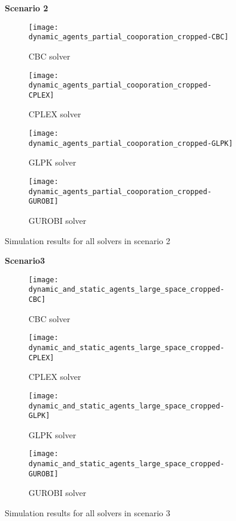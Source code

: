 \begin{figure}[H]
    \centering
    \textbf{Scenario 2}\par \medskip
    \begin{subfigure}{0.49\textwidth}
        \centering
        \texttt{[image: dynamic\_agents\_partial\_cooporation\_cropped-CBC]}
        \caption{CBC solver}
    \end{subfigure}
    \begin{subfigure}{0.49\textwidth}
        \centering
        \texttt{[image: dynamic\_agents\_partial\_cooporation\_cropped-CPLEX]}
        \caption{CPLEX solver}
    \end{subfigure}
    \begin{subfigure}{0.49\textwidth}
        \centering
        \texttt{[image: dynamic\_agents\_partial\_cooporation\_cropped-GLPK]}
        \caption{GLPK solver}
    \end{subfigure}
    \begin{subfigure}{0.49\textwidth}
        \centering
        \texttt{[image: dynamic\_agents\_partial\_cooporation\_cropped-GUROBI]}
        \caption{GUROBI solver}
    \end{subfigure}
	\label{fig:dynamic_agents_partial_cooperation_cropped}
	\caption{Simulation results for all solvers in scenario 2}
\end{figure}

\begin{figure}[H]
    \centering
    \textbf{Scenario3}\par \medskip
    \begin{subfigure}{0.49\textwidth}
        \centering
        \texttt{[image: dynamic\_and\_static\_agents\_large\_space\_cropped-CBC]}
        \caption{CBC solver}
    \end{subfigure}
    \begin{subfigure}{0.49\textwidth}
        \centering
        \texttt{[image: dynamic\_and\_static\_agents\_large\_space\_cropped-CPLEX]}
        \caption{CPLEX solver}
    \end{subfigure}
    \begin{subfigure}{0.49\textwidth}
        \centering
        \texttt{[image: dynamic\_and\_static\_agents\_large\_space\_cropped-GLPK]}
        \caption{GLPK solver}
    \end{subfigure}
    \begin{subfigure}{0.49\textwidth}
        \centering
        \texttt{[image: dynamic\_and\_static\_agents\_large\_space\_cropped-GUROBI]}
        \caption{GUROBI solver}
    \end{subfigure}
	\label{fig:dynamic_and_static_agents_large_space_cropped}
	\caption{Simulation results for all solvers in scenario 3}
\end{figure}

